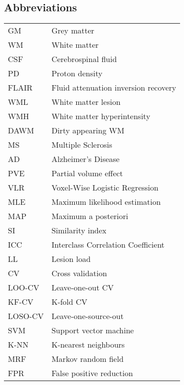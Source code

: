 \begin{singlespacing}
\tableofcontents
\newpage
\listoffigures
\newpage
\listoftables
\newpage
\subsection*{Abbreviations}
\begin{table}[H]
  \begin{tabu} to \textwidth{lX[l]}\hline
    GM      & Grey matter \\
    WM      & White matter \\
    CSF     & Cerebrospinal fluid \\
    PD      & Proton density \\
    FLAIR   & Fluid attenuation inversion recovery \\
    WML     & White matter lesion \\
    WMH     & White matter hyperintensity \\
    DAWM    & Dirty appearing WM \\
    MS      & Multiple Sclerosis \\ 
    AD      & Alzheimer's Disease \\
    PVE     & Partial volume effect \\
    VLR     & Voxel-Wise Logistic Regression \\
    MLE     & Maximum likelihood estimation \\
    MAP     & Maximum a posteriori \\
    SI      & Similarity index \\
    ICC     & Interclass Correlation Coefficient \\
    LL      & Lesion load \\
    CV      & Cross validation \\
    LOO-CV  & Leave-one-out CV \\
    KF-CV   & K-fold CV \\
    LOSO-CV & Leave-one-source-out \\
    SVM     & Support vector machine \\
    K-NN    & K-nearest neighbours \\
    MRF     & Markov random field \\
    FPR     & False positive reduction \\
    \hline
  \end{tabu}
\end{table}
\end{singlespacing}
\clearpage
{}
\setcounter{page}{1}

